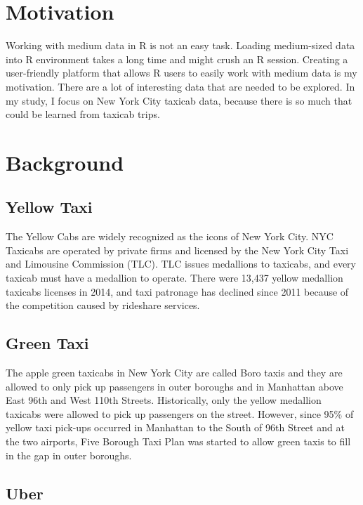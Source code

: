 \documentclass[12pt,twoside]{reedthesis}
\theoremstyle{definition}
\theoremstyle{definition}
\theoremstyle{definition}
\theoremstyle{remark}
\begin{document}
\section{Motivation}\label{motivation}

Working with medium data in R is not an easy task. Loading medium-sized
data into R environment takes a long time and might crush an R session.
Creating a user-friendly platform that allows R users to easily work
with medium data is my motivation. There are a lot of interesting data
that are needed to be explored. In my study, I focus on New York City
taxicab data, because there is so much that could be learned from
taxicab trips.

\section{Background}\label{background}

\subsection{Yellow Taxi}\label{yellow-taxi}

The Yellow Cabs are widely recognized as the icons of New York City. NYC
Taxicabs are operated by private firms and licensed by the New York City
Taxi and Limousine Commission (TLC). TLC issues medallions to taxicabs,
and every taxicab must have a medallion to operate. There were 13,437
yellow medallion taxicabs licenses in 2014, and taxi patronage has
declined since 2011 because of the competition caused by rideshare
services.

\subsection{Green Taxi}\label{green-taxi}

The apple green taxicabs in New York City are called Boro taxis and they
are allowed to only pick up passengers in outer boroughs and in
Manhattan above East 96th and West 110th Streets. Historically, only the
yellow medallion taxicabs were allowed to pick up passengers on the
street. However, since 95\% of yellow taxi pick-ups occurred in
Manhattan to the South of 96th Street and at the two airports, Five
Borough Taxi Plan was started to allow green taxis to fill in the gap in
outer boroughs.

\subsection{Uber}\label{uber}
\end{document}

